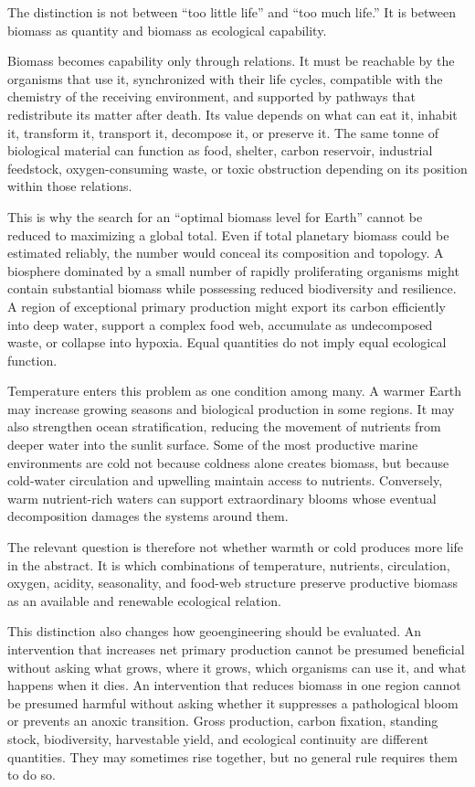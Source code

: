 \documentclass[11pt,oneside]{book}
\begin{document}
The distinction is not between ``too little life'' and ``too much life.'' It is between biomass as quantity and biomass as ecological capability.

Biomass becomes capability only through relations. It must be reachable by the organisms that use it, synchronized with their life cycles, compatible with the chemistry of the receiving environment, and supported by pathways that redistribute its matter after death. Its value depends on what can eat it, inhabit it, transform it, transport it, decompose it, or preserve it. The same tonne of biological material can function as food, shelter, carbon reservoir, industrial feedstock, oxygen-consuming waste, or toxic obstruction depending on its position within those relations.

This is why the search for an ``optimal biomass level for Earth'' cannot be reduced to maximizing a global total. Even if total planetary biomass could be estimated reliably, the number would conceal its composition and topology. A biosphere dominated by a small number of rapidly proliferating organisms might contain substantial biomass while possessing reduced biodiversity and resilience. A region of exceptional primary production might export its carbon efficiently into deep water, support a complex food web, accumulate as undecomposed waste, or collapse into hypoxia. Equal quantities do not imply equal ecological function.

Temperature enters this problem as one condition among many. A warmer Earth may increase growing seasons and biological production in some regions. It may also strengthen ocean stratification, reducing the movement of nutrients from deeper water into the sunlit surface. Some of the most productive marine environments are cold not because coldness alone creates biomass, but because cold-water circulation and upwelling maintain access to nutrients. Conversely, warm nutrient-rich waters can support extraordinary blooms whose eventual decomposition damages the systems around them.

The relevant question is therefore not whether warmth or cold produces more life in the abstract. It is which combinations of temperature, nutrients, circulation, oxygen, acidity, seasonality, and food-web structure preserve productive biomass as an available and renewable ecological relation.

This distinction also changes how geoengineering should be evaluated. An intervention that increases net primary production cannot be presumed beneficial without asking what grows, where it grows, which organisms can use it, and what happens when it dies. An intervention that reduces biomass in one region cannot be presumed harmful without asking whether it suppresses a pathological bloom or prevents an anoxic transition. Gross production, carbon fixation, standing stock, biodiversity, harvestable yield, and ecological continuity are different quantities. They may sometimes rise together, but no general rule requires them to do so.
\end{document}
